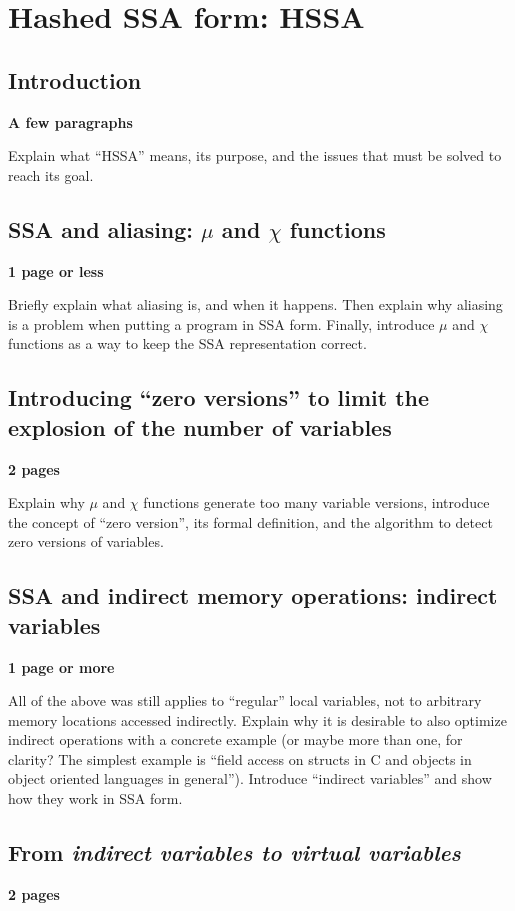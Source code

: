 \chapter{Hashed SSA form: HSSA }


\section{Introduction}
\textbf{A few paragraphs}

Explain what ``HSSA'' means, its purpose, and the issues that must be solved to reach its goal.

\section{SSA and aliasing: $\mu$ and $\chi$ functions}
\textbf{1 page or less}

Briefly explain what aliasing is, and when it happens.
Then explain why aliasing is a problem when putting a program in SSA form.
Finally, introduce $\mu$ and $\chi$ functions as a way to keep the SSA representation correct.

\section{Introducing ``zero versions'' to limit the explosion of the number of variables}
\textbf{2 pages}

Explain why $\mu$ and $\chi$ functions generate too many variable versions, introduce the concept of ``zero version'', its formal definition, and the algorithm to detect zero versions of variables.

\section{SSA and indirect memory operations: indirect variables}
\textbf{1 page or more}

All of the above was still applies to ``regular'' local variables, not to arbitrary memory locations accessed indirectly.
Explain why it is desirable to also optimize indirect operations with a concrete example (or maybe more than one, for clarity? The simplest example is ``field access on structs in C and objects in object oriented languages in general'').
Introduce ``indirect variables'' and show how they work in SSA form.

\section{From \em{indirect} variables to \em{virtual} variables}
\textbf{2 pages}


